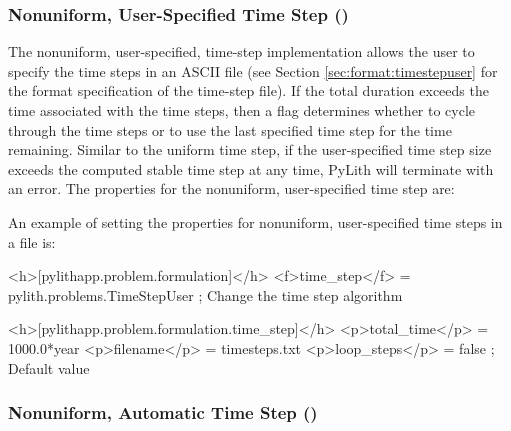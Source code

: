 \subsubsection{Nonuniform, User-Specified Time Step ()}

The nonuniform, user-specified, time-step implementation allows the
user to specify the time steps in an ASCII file (see Section
\vref{sec:format:timestepuser} for the format specification of the
time-step file). If the total duration exceeds the time associated
with the time steps, then a flag determines whether to cycle through
the time steps or to use the last specified time step for the time
remaining. Similar to the uniform time step, if the user-specified
time step size exceeds the computed stable time step at any time,
PyLith will terminate with an error.  The properties for the
nonuniform, user-specified time step are:
\begin{inventory}
\end{inventory}
An example of setting the properties for nonuniform, user-specified
time steps in a  file is:
\begin{cfg}
<h>[pylithapp.problem.formulation]</h>
<f>time_step</f> = pylith.problems.TimeStepUser ; Change the time step algorithm

<h>[pylithapp.problem.formulation.time_step]</h>
<p>total_time</p> = 1000.0*year
<p>filename</p> = timesteps.txt
<p>loop_steps</p> = false ; Default value
\end{cfg}

\subsubsection{Nonuniform, Automatic Time Step ()}

